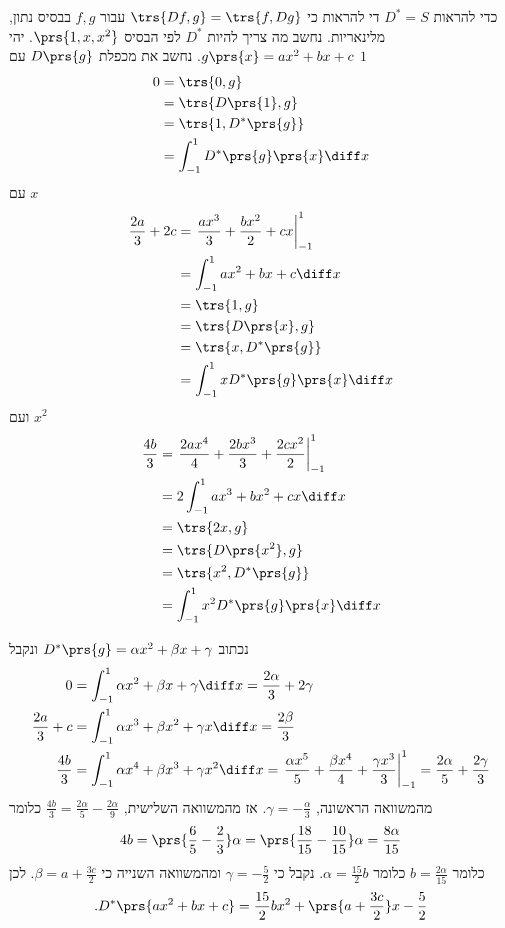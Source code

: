 \documentclass[a4paper,10pt,twoside,openany]{book}
\begin{document}
\begin{solution}
כדי להראות
$D^* = S$
די להראות כי
$\trs{Df,g} = \trs{f,Dg}$
עבור
$f,g$
בבסיס נתון, מלינאריות.
נחשב מה צריך להיות
$D^*$
לפי הבסיס
$\prs{1,x,x^2}$.
יהי
$g\prs{x} = ax^2 + bx + c$.
נחשב את מכפלת
$D\prs{g}$
עם
$1$
\begin{align*}
    0 &= \trs{0,g} \\&= \trs{D\prs{1}, g} \\&= \trs{1, D^*\prs{g}} \\&= \int_{-1}^1 D^*\prs{g}\prs{x} \diff x
\end{align*}
עם
$x$
\begin{align*}
        \frac{2a}{3} + 2c &= \left. \frac{ax^3}{3} + \frac{bx^2}{2} + cx \right|_{-1}^1 \\&= \int_{-1}^1 ax^2 + bx + c \diff x \\&= \trs{1,g} \\&= \trs{D\prs{x}, g} \\&= \trs{x, D^*\prs{g}} \\&= \int_{-1}^1 x D^*\prs{g}\prs{x} \diff x
\end{align*}
ועם
$x^2$
\begin{align*}
        \frac{4b}{3} &= \left. \frac{2ax^4}{4} + \frac{2bx^3}{3} + \frac{2cx^2}{2} \right|_{-1}^1 \\&= 2 \int_{-1}^1 ax^3 + bx^2 + cx \diff x \\&= \trs{2x,g} \\&= \trs{D\prs{x^2}, g} \\&= \trs{x^2, D^*\prs{g}} \\&= \int_{-1}^1 x^2 D^*\prs{g}\prs{x} \diff x
\end{align*}

נכתוב
$D^*\prs{g} = \alpha x^2 + \beta x + \gamma$
ונקבל
\begin{align*}
    0 &= \int_{-1}^1 \alpha x^2 + \beta x + \gamma \diff x = \frac{2 \alpha}{3} + 2 \gamma \\
    \frac{2a}{3} + c &= \int_{-1}^1 \alpha x^3 + \beta x^2 + \gamma x \diff x = \frac{2\beta}{3} \\
    \frac{4b}{3} &= \int_{-1}^1 \alpha x^4 + \beta x^3 + \gamma x^2 \diff x = \left. \frac{\alpha x^5}{5} + \frac{\beta x^4}{4} + \frac{\gamma x^3}{3} \right|_{-1}^1 = \frac{2 \alpha}{5} + \frac{2 \gamma}{3}
\end{align*}
מהמשוואה הראשונה,
$\gamma = -\frac{\alpha}{3}$.
אז מהמשוואה השלישית,
$\frac{4b}{3} = \frac{2 \alpha}{5} - \frac{2 \alpha}{9}$
כלומר
\[4b = \prs{\frac{6}{5} - \frac{2}{3}}\alpha = \prs{\frac{18}{15} - \frac{10}{15}}\alpha = \frac{8 \alpha}{15}\]
כלומר
$b = \frac{2 \alpha}{15}$
כלומר
$\alpha = \frac{15}{2} b$.
נקבל כי
$\gamma = -\frac{5}{2}$
ומהמשוואה השנייה כי
$\beta = a + \frac{3c}{2}$.
לכן
\[\text{.} D^*\prs{ax^2 + bx + c} = \frac{15}{2} b x^2 + \prs{a + \frac{3c}{2}}x - \frac{5}{2}\]
\end{solution}
\end{document}

